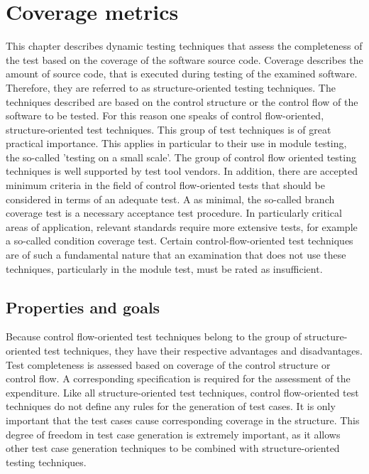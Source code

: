 \documentclass[master,english,smartquotes,apa]{hgbthesis}
\begin{document}
	

	
	\section{Coverage metrics}
	
	This chapter describes dynamic testing techniques that assess the completeness of the test based on the coverage of the software source code. Coverage describes the amount of source code, that is executed during testing of the examined software. Therefore, they are referred to as structure-oriented testing techniques. The techniques described are based on the control structure or the control flow of the software to be tested. For this reason one speaks of control flow-oriented, structure-oriented test techniques. This group of test techniques is of great practical importance. This applies in particular to their use in module testing, the so-called 'testing on a small scale'. The group of control flow oriented testing techniques is well supported by test tool vendors. In addition, there are accepted minimum criteria in the field of control flow-oriented tests that should be considered in terms of an adequate test. A as minimal, the so-called branch coverage test is a necessary acceptance test procedure. In particularly critical areas of application, relevant standards require more extensive tests, for example a so-called condition coverage test. Certain control-flow-oriented test techniques are of such a fundamental nature that an examination that does not use these techniques, particularly in the module test, must be rated as insufficient.	
	

	\subsection{Properties and goals }

	Because control flow-oriented test techniques belong to the group of structure-oriented test techniques, they have their respective advantages and disadvantages. Test completeness is assessed based on coverage of the control structure or control flow. A corresponding specification is required for the assessment of the expenditure. Like all structure-oriented test techniques, control flow-oriented test techniques do not define any rules for the generation of test cases. It is only important that the test cases cause corresponding coverage in the structure. This degree of freedom in test case generation is extremely important, as it allows other test case generation techniques to be combined with structure-oriented testing techniques.
\end{document}

